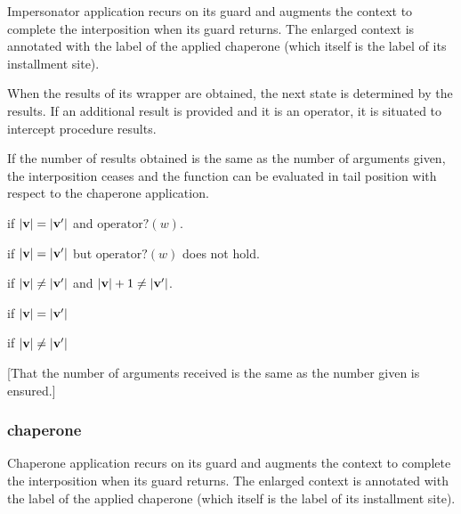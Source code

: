 Impersonator application recurs on its guard and augments the context to complete the interposition when its guard returns.
The enlarged context is annotated with the label of the applied chaperone (which itself is the label of its installment site).


When the results of its wrapper are obtained, the next state is determined by the results.
If an additional result is provided and it is an operator, it is situated to intercept procedure results.

If the number of results obtained is the same as the number of arguments given, the interposition ceases and the function can be evaluated in tail position with respect to the chaperone application.


if $|\mathbf{v}|=|\mathbf{v'}|$ and $\mathrm{operator?}(w)$.

if $|\mathbf{v}|=|\mathbf{v'}|$ but $\mathrm{operator?}(w)$ does not hold.

if $|\mathbf{v}|\ne|\mathbf{v'}|$ and $|\mathbf{v}|+1\ne|\mathbf{v'}|$.







\red{\sval{\impcrk{\vv}::\ks}{\sigma}{\vvp}}{\sval{\ks}{\sigma}{\vvp}}
if $|\mathbf{v}|=|\mathbf{v'}|$

if $|\mathbf{v}|\ne|\mathbf{v'}|$

[That the number of arguments received is the same as the number given is ensured.]



\subsubsection{chaperone}

Chaperone application recurs on its guard and augments the context to complete the interposition when its guard returns.
The enlarged context is annotated with the label of the applied chaperone (which itself is the label of its installment site).

